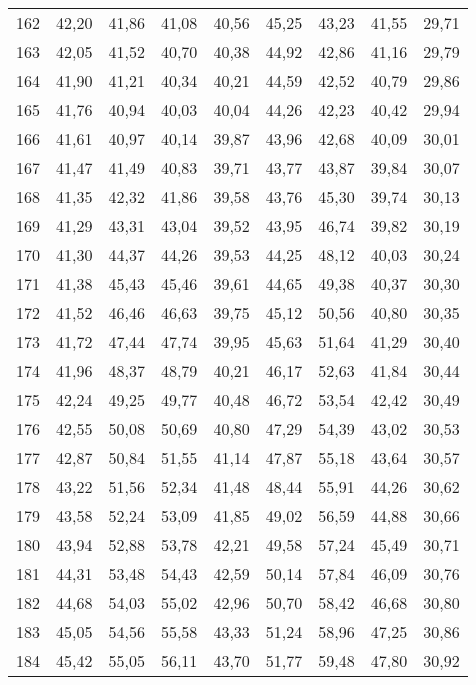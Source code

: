 \begin{longtable}{c c c c c c c c c}
      162& 	42,20& 	41,86& 	41,08& 	40,56& 	45,25& 	43,23& 	41,55& 	29,71 \\
      163& 	42,05& 	41,52& 	40,70& 	40,38& 	44,92& 	42,86& 	41,16& 	29,79 \\
      164& 	41,90& 	41,21& 	40,34& 	40,21& 	44,59& 	42,52& 	40,79& 	29,86 \\
      165& 	41,76& 	40,94& 	40,03& 	40,04& 	44,26& 	42,23& 	40,42& 	29,94 \\
      166& 	41,61& 	40,97& 	40,14& 	39,87& 	43,96& 	42,68& 	40,09& 	30,01 \\
      167& 	41,47& 	41,49& 	40,83& 	39,71& 	43,77& 	43,87& 	39,84& 	30,07 \\
      168& 	41,35& 	42,32& 	41,86& 	39,58& 	43,76& 	45,30& 	39,74& 	30,13 \\
      169& 	41,29& 	43,31& 	43,04& 	39,52& 	43,95& 	46,74& 	39,82& 	30,19 \\
      170& 	41,30& 	44,37& 	44,26& 	39,53& 	44,25& 	48,12& 	40,03& 	30,24 \\
      171& 	41,38& 	45,43& 	45,46& 	39,61& 	44,65& 	49,38& 	40,37& 	30,30 \\
      172& 	41,52& 	46,46& 	46,63& 	39,75& 	45,12& 	50,56& 	40,80& 	30,35 \\
      173& 	41,72& 	47,44& 	47,74& 	39,95& 	45,63& 	51,64& 	41,29& 	30,40 \\
      174& 	41,96& 	48,37& 	48,79& 	40,21& 	46,17& 	52,63& 	41,84& 	30,44 \\
      175& 	42,24& 	49,25& 	49,77& 	40,48& 	46,72& 	53,54& 	42,42& 	30,49 \\
      176& 	42,55& 	50,08& 	50,69& 	40,80& 	47,29& 	54,39& 	43,02& 	30,53 \\
      177& 	42,87& 	50,84& 	51,55& 	41,14& 	47,87& 	55,18& 	43,64& 	30,57 \\
      178& 	43,22& 	51,56& 	52,34& 	41,48& 	48,44& 	55,91& 	44,26& 	30,62 \\
      179& 	43,58& 	52,24& 	53,09& 	41,85& 	49,02& 	56,59& 	44,88& 	30,66 \\
      180& 	43,94& 	52,88& 	53,78& 	42,21& 	49,58& 	57,24& 	45,49& 	30,71 \\
      181& 	44,31& 	53,48& 	54,43& 	42,59& 	50,14& 	57,84& 	46,09& 	30,76 \\
      182& 	44,68& 	54,03& 	55,02& 	42,96& 	50,70& 	58,42& 	46,68& 	30,80 \\
      183& 	45,05& 	54,56& 	55,58& 	43,33& 	51,24& 	58,96& 	47,25& 	30,86 \\
      184& 	45,42& 	55,05& 	56,11& 	43,70& 	51,77& 	59,48& 	47,80& 	30,92 \\

\end{longtable}
